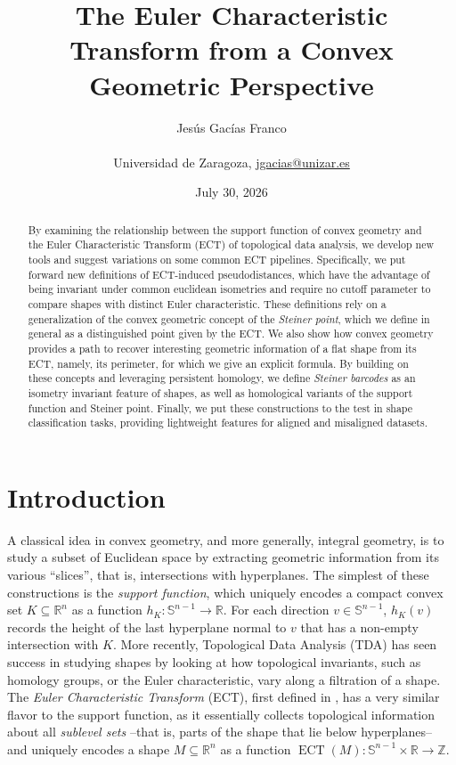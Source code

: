 \documentclass[a4paper]{article}
\title{The Euler Characteristic Transform from a Convex Geometric Perspective}
\author{Jesús Gacías Franco \\ \\ Universidad de Zaragoza, \url{jgacias@unizar.es}}
\date{July 30, 2026}
\newcommand{\ECT}{\operatorname{ECT}}
\newcommand{\bb}{\mathbb}
\begin{document}
	\maketitle

	
	\begin{abstract}
		By examining the relationship between the support function of convex geometry and the Euler Characteristic Transform (ECT) of topological data analysis, we develop new tools and suggest variations on some common ECT pipelines. Specifically, we put forward new definitions of ECT-induced pseudodistances, which have the advantage of being invariant under common euclidean isometries and require no cutoff parameter to compare shapes with distinct Euler characteristic. These definitions rely on a generalization of the convex geometric concept of the \emph{Steiner point}, which we define in general as a distinguished point given by the ECT. We also show how convex geometry provides a path to recover interesting geometric information of a flat shape from its ECT, namely, its perimeter, for which we give an explicit formula. By building on these concepts and leveraging persistent homology, we define \emph{Steiner barcodes} as an isometry invariant feature of shapes, as well as homological variants of the support function and Steiner point. Finally, we put these constructions to the test in shape classification tasks, providing lightweight features for aligned and misaligned datasets.
	\end{abstract}
	
	\tableofcontents
	
\section{Introduction}
\label{SectIntro}
A classical idea in convex geometry, and more generally, integral geometry, is to study a subset of Euclidean space by extracting geometric information from its various ``slices'', that is, intersections with hyperplanes. The simplest of these constructions is the \emph{support function}, which uniquely encodes a compact convex set $K\subseteq \bb R^n$ as a function $h_K:\mathbb S^{n-1} \to \mathbb R$. For each direction $v \in \bb S^{n-1}$, $h_K(v)$ records the height of the last hyperplane normal to $v$ that has a non-empty intersection with $K$. More recently, Topological Data Analysis (TDA) has seen success in studying shapes by looking at how topological invariants, such as homology groups, or the Euler characteristic, vary along a filtration of a shape. The \emph{Euler Characteristic Transform} (ECT), first defined in \cite{turner2014persistent}, has a very similar flavor to the support function, as it essentially collects topological information about all \emph{sublevel sets} --that is, parts of the shape that lie below hyperplanes-- and uniquely encodes a shape $M\subseteq \bb R^n$ as a function $\ECT(M):\mathbb S^{n-1} \times \mathbb R \to \bb Z$. 
\end{document}
